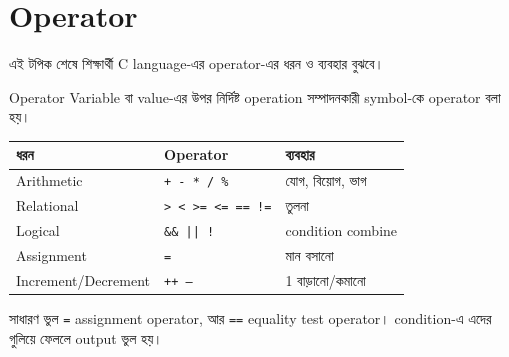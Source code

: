\section{Operator}

\begin{learningbox}
এই টপিক শেষে শিক্ষার্থী C language-এর operator-এর ধরন ও ব্যবহার বুঝবে।
\end{learningbox}

\begin{definitionbox}{Operator}
Variable বা value-এর উপর নির্দিষ্ট operation সম্পাদনকারী symbol-কে operator বলা হয়।
\end{definitionbox}

\begin{center}
\begin{tabular}{|p{}|p{}|p{}|}
\hline
\textbf{ধরন} & \textbf{Operator} & \textbf{ব্যবহার} \\
\hline
Arithmetic & \texttt{+ - * / \%} & যোগ, বিয়োগ, ভাগ \\
\hline
Relational & \texttt{> < >= <= == !=} & তুলনা \\
\hline
Logical & \texttt{\&\& || !} & condition combine \\
\hline
Assignment & \texttt{=} & মান বসানো \\
\hline
Increment/Decrement & \texttt{++ --} & 1 বাড়ানো/কমানো \\
\hline
\end{tabular}
\end{center}

\begin{mistakebox}{সাধারণ ভুল}
\texttt{=} assignment operator, আর \texttt{==} equality test operator। condition-এ এদের গুলিয়ে ফেললে output ভুল হয়।
\end{mistakebox}

